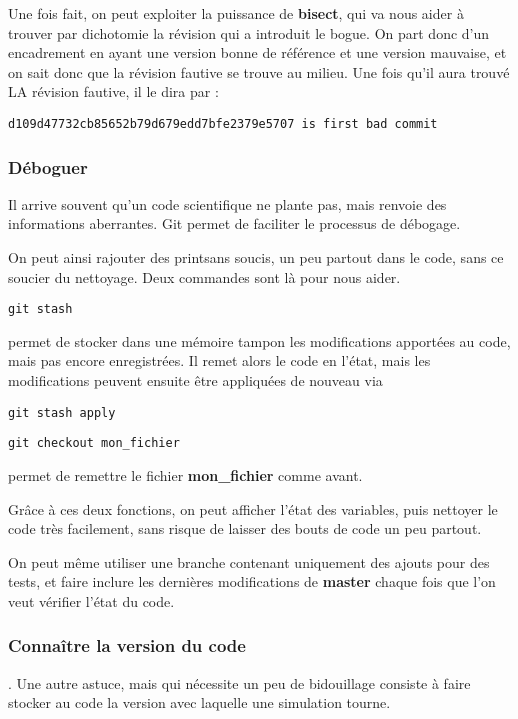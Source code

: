 Une fois fait, on peut exploiter la puissance de \textbf{bisect}, qui va nous aider à trouver par dichotomie la révision qui a introduit le bogue. On part donc d'un encadrement en ayant une version bonne de référence et une version mauvaise, et on sait donc que la révision fautive se trouve au milieu.
Une fois qu'il aura trouvé LA révision fautive, il le dira par :
\begin{verbatim}
d109d47732cb85652b79d679edd7bfe2379e5707 is first bad commit
\end{verbatim}


\subsubsection{Déboguer}
Il arrive souvent qu'un code scientifique ne plante pas, mais renvoie des informations aberrantes. Git permet de faciliter le processus de débogage. 

On peut ainsi rajouter des \og print\fg sans soucis, un peu partout dans le code, sans ce soucier du nettoyage. Deux commandes sont là pour nous aider. 

\begin{verbatim}
git stash
\end{verbatim}
permet de stocker dans une mémoire tampon les modifications apportées au code, mais pas encore enregistrées. Il remet alors le code en l'état, mais les modifications peuvent ensuite être appliquées de nouveau via 
\begin{verbatim}
git stash apply
\end{verbatim}

\bigskip

\begin{verbatim}
git checkout mon_fichier
\end{verbatim}
permet de remettre le fichier \textbf{mon\_fichier} comme avant. 

\bigskip

Grâce à ces deux fonctions, on peut afficher l'état des variables, puis nettoyer le code très facilement, sans risque de laisser des bouts de code un peu partout. 

On peut même utiliser une branche contenant uniquement des ajouts pour des tests, et faire inclure les dernières modifications de \textbf{master} chaque fois que l'on veut vérifier l'état du code. 

\subsubsection{Connaître la version du code}. 
Une autre astuce, mais qui nécessite un peu de bidouillage consiste à faire stocker au code la version avec laquelle une simulation tourne. 

